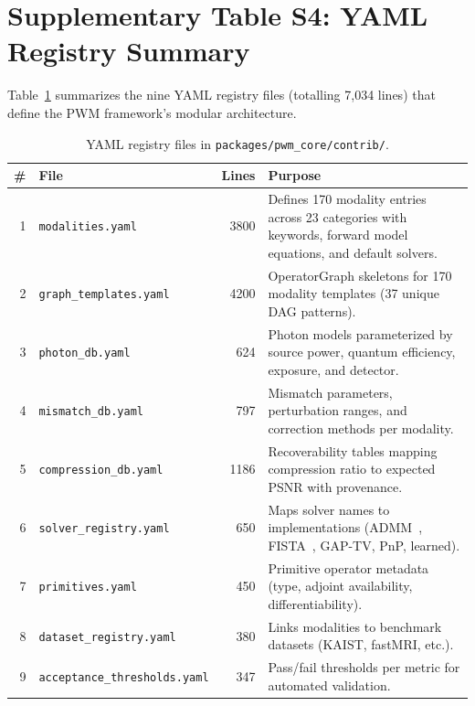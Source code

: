 \documentclass[11pt]{article}
\theoremstyle{definition}
\begin{document}
\newpage

\section{Supplementary Table S4: YAML Registry Summary}
\label{sec:yaml}

Table~\ref{tab:yaml} summarizes the nine YAML registry files (totalling
7,034 lines) that define the PWM framework's modular architecture.

\begin{table}[htbp]
\centering
\caption{YAML registry files in \texttt{packages/pwm\_core/contrib/}.}
\label{tab:yaml}
\begin{tabular}{r l r p{6.5cm}}
\toprule
\textbf{\#} & \textbf{File} & \textbf{Lines} & \textbf{Purpose} \\
\midrule
1 & \texttt{modalities.yaml}           & 3800 & Defines 170 modality entries across 23 categories with keywords, forward model equations, and default solvers. \\
2 & \texttt{graph\_templates.yaml}     & 4200 & OperatorGraph skeletons for 170 modality templates (37 unique DAG patterns). \\
3 & \texttt{photon\_db.yaml}           & 624 & Photon models parameterized by source power, quantum efficiency, exposure, and detector. \\
4 & \texttt{mismatch\_db.yaml}         & 797 & Mismatch parameters, perturbation ranges, and correction methods per modality. \\
5 & \texttt{compression\_db.yaml}      & 1186 & Recoverability tables mapping compression ratio to expected PSNR with provenance. \\
6 & \texttt{solver\_registry.yaml}     & 650 & Maps solver names to implementations (ADMM~\cite{boyd2011admm}, FISTA~\cite{beck2009fista}, GAP-TV, PnP, learned). \\
7 & \texttt{primitives.yaml}           & 450 & Primitive operator metadata (type, adjoint availability, differentiability). \\
8 & \texttt{dataset\_registry.yaml}    & 380 & Links modalities to benchmark datasets (KAIST, fastMRI, etc.). \\
9 & \texttt{acceptance\_thresholds.yaml} & 347 & Pass/fail thresholds per metric for automated validation. \\
\bottomrule
\end{tabular}
\end{table}
\end{document}

